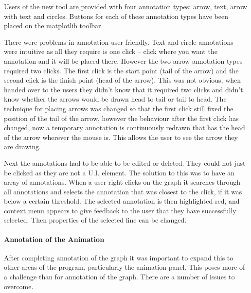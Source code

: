 Users of the new tool are provided with four annotation types: arrow, text, arrow with text and circles.  Buttons for each of these annotation types have been placed on the matplotlib toolbar.

There were problems in annotation user friendly.  Text and circle annotations were intuitive as all they require is one click -- click where you want the annotation and it will be placed there.  However the two arrow annotation types required two clicks.  The first click is the start point (tail of the arrow) and the second click is the finish point (head of the arrow).  This was not obvious, when handed over to the users they didn't know that it required two clicks and didn't know whether the arrows would be drawn head to tail or tail to head.  The technique for placing arrows was changed so that the first click still fixed the position of the tail of the arrow, however the behaviour after the first click has changed, now a temporary annotation is continuously redrawn that has the head of the arrow wherever the mouse is.  This allows the user to see the arrow they are drawing.

Next the annotations had to be able to be edited or deleted.  They could not just be clicked as they are not a U.I. element.  The solution to this was to have an array of annotations.  When a user right clicks on the graph it searches through all annotations and selects the annotation that was closest to the click, if it was below a certain threshold.  The selected annotation is then highlighted red, and context menu appears to give feedback to the user that they have successfully selected.  Then properties of the selected line can be changed.

\paragraph{Annotation of the Animation}

After completing annotation of the graph it was important to expand this to other areas of the program, particularly the animation panel.  This poses more of a challenge than for annotation of the graph.  There are a number of issues to overcome.

